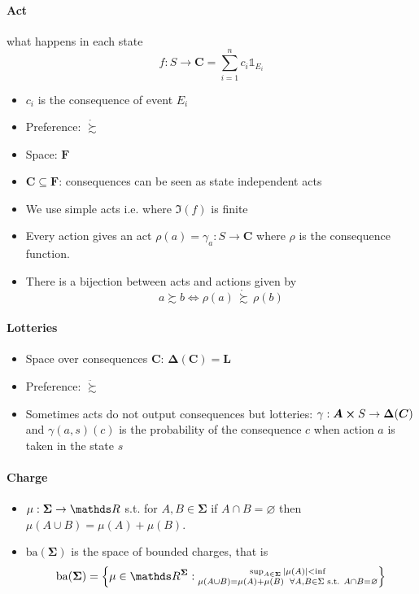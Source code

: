 \documentclass[landscape, 12pt]{extarticle}
\begin{document}
\begin{multicols}{2}
	\paragraph{Act} what happens in each state
	\[
		f: S \to \bm C = \sum^n_{i = 1} c_i \mathds 1_{E_i}
	\]
	\begin{itemize}
		\item $c_i$ is the consequence of event $E_i$
		\item Preference: $\mathring \succsim$
		\item Space: $\bm F$
		\item $\bm C \subseteq \bm F$: consequences can be seen as state independent acts
		\item We use simple acts i.e. where $\Im(f)$ is finite
		\item Every action gives an act $\rho(a) = \gamma_a: S \to \bm C$
		      where $\rho$ is the consequence function.
		\item There is a bijection between acts and actions given by
		      \[
			      a \succsim b \iff \rho(a) \, \mathring \succsim \, \rho(b)
		      \]
	\end{itemize}

	\paragraph{Lotteries}
	\begin{itemize}
		\item Space over consequences $\bm C$: $\bm \Delta(\bm C) = \bm L$
		\item Preference: $\ddot \succsim$
		\item Sometimes acts do not output consequences but lotteries:
		      $\gamma: \bm A \cross S \to \bm \Delta(\bm C)$ and $\gamma(a, s)(c)$ is the probability
		      of the consequence $c$ when action $a$ is taken in the state $s$
	\end{itemize}

	\paragraph{Charge}
	\begin{itemize}
		\item $\mu : \bm \Sigma \to \R$ s.t. for $A, B \in \bm \Sigma$ if $A \cap B = \varnothing$
		      then $\mu(A \cup B) = \mu(A) + \mu(B)$.
		\item $\mathrm{ba}(\bm \Sigma)$ is the space of bounded charges, that is
		      \[
			      \mathrm{ba}(\bm \Sigma) = \left\{
			      \mu \in \R^{\bm \Sigma}:
			      \substack{
				      \sup_{A \in \bm \Sigma} \abs{\mu(A)} < \inf \\
				      \mu(A \cup B) = \mu(A) + \mu(B) \enspace \forall A, B \in \Sigma \text{ s.t. } A \cap B = \varnothing
			      }
			      \right\}
		      \]
	\end{itemize}

\end{multicols}
\end{document}
